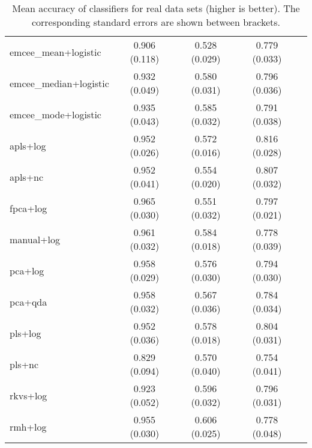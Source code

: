 \begin{table}[htbp!]
\begin{tabular}{lcccc}
  emcee\_mean+logistic & 0.906 (0.118) & 0.528 (0.029) & 0.779 (0.033) \\
emcee\_median+logistic & 0.932 (0.049) & 0.580 (0.031) & 0.796 (0.036) \\
  emcee\_mode+logistic & 0.935 (0.043) & 0.585 (0.032) & 0.791 (0.038) \\
              apls+log & 0.952 (0.026) & 0.572 (0.016) & 0.816 (0.028) \\
              apls+nc & 0.952 (0.041) & 0.554 (0.020) & 0.807 (0.032) \\
             fpca+log & 0.965 (0.030) & 0.551 (0.032) & 0.797 (0.021) \\
           manual+log & 0.961 (0.032) & 0.584 (0.018) & 0.778 (0.039) \\
              pca+log & 0.958 (0.029) & 0.576 (0.030) & 0.794 (0.030) \\
              pca+qda & 0.958 (0.032) & 0.567 (0.036) & 0.784 (0.034) \\
              pls+log & 0.952 (0.036) & 0.578 (0.018) & 0.804 (0.031) \\
               pls+nc & 0.829 (0.094) & 0.570 (0.040) & 0.754 (0.041) \\
             rkvs+log & 0.923 (0.052) & 0.596 (0.032) & 0.796 (0.031) \\
              rmh+log & 0.955 (0.030) & 0.606 (0.025) & 0.778 (0.048) \\

\bottomrule
\end{tabular}
  \caption{Mean accuracy of classifiers for real data sets (higher is better). The corresponding standard errors are shown between brackets.}
\end{table}
